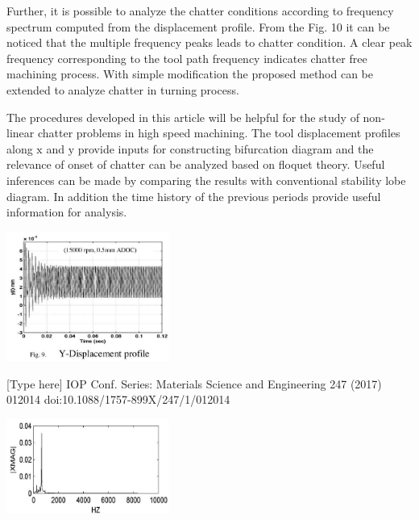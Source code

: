 \documentclass[10pt]{article}
\begin{document}
Further, it is possible to analyze the chatter conditions according to frequency spectrum computed from the displacement profile. From the Fig. 10 it can be noticed that the multiple frequency peaks leads to chatter condition. A clear peak frequency corresponding to the tool path frequency indicates chatter free machining process. With simple modification the proposed method can be extended to analyze chatter in turning process.

The procedures developed in this article will be helpful for the study of non-linear chatter problems in high speed machining. The tool displacement profiles along \(\mathrm{x}\) and \(\mathrm{y}\) provide inputs for constructing bifurcation diagram and the relevance of onset of chatter can be analyzed based on floquet theory. Useful inferences can be made by comparing the results with conventional stability lobe diagram. In addition the time history of the previous periods provide useful information for analysis.

\begin{center}
\includegraphics[max width=0.4\textwidth]{images/01948e67-2b92-7dd1-b16f-a9746c8d80be_9_567_1492_509_405_0.jpg}
\end{center}
\hspace*{3em} 

[Type here] IOP Conf. Series: Materials Science and Engineering 247 (2017) 012014 doi:10.1088/1757-899X/247/1/012014

\begin{center}
\includegraphics[max width=0.4\textwidth]{images/01948e67-2b92-7dd1-b16f-a9746c8d80be_10_567_255_509_295_0.jpg}
\end{center}
\hspace*{3em} 
\end{document}
